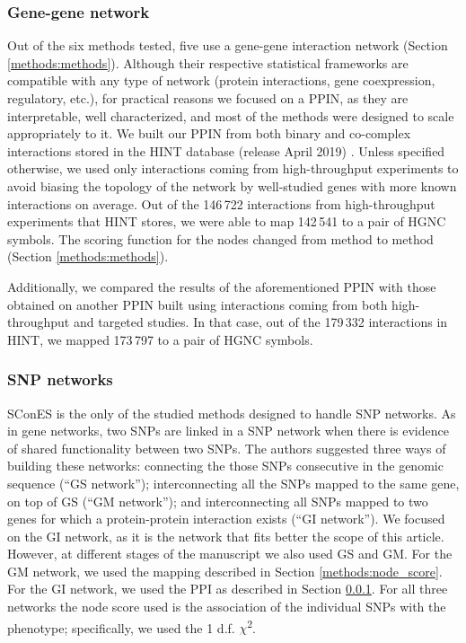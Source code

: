 \documentclass[twocolumn, 10pt]{article}
\begin{document}
\subsubsection{Gene-gene network}
\label{methods:gene_network}
Out of the six methods tested, five use a gene-gene interaction network (Section \ref{methods:methods}). Although their respective statistical frameworks are compatible with any type of network (protein interactions, gene coexpression, regulatory, etc.), for practical reasons we focused on a PPIN, as they are interpretable, well characterized, and most of the methods were designed to scale appropriately to it. We built our PPIN from both binary and co-complex interactions stored in the HINT database (release April 2019) \cite{das_hint:_2012}. Unless specified otherwise, we used only interactions coming from high-throughput experiments to avoid biasing the topology of the network by well-studied genes with more known interactions on average. Out of the 146\,722 interactions from high-throughput experiments that HINT stores, we were able to map 142\,541 to a pair of HGNC symbols. The scoring function for the nodes changed from method to method (Section \ref{methods:methods}).

Additionally, we compared the results of the aforementioned PPIN with those obtained on another PPIN built using interactions coming from both high-throughput and targeted studies. In that case, out of the 179\,332 interactions in HINT, we mapped 173\,797 to a pair of HGNC symbols. 

\subsubsection{SNP networks}
\label{methods:snp_network}
SConES \cite{azencott_efficient_2013} is the only of the studied methods designed to handle SNP networks. As in gene networks, two SNPs are linked in a SNP network when there is evidence of shared functionality between two SNPs. The authors suggested three ways of building these networks: connecting the those SNPs consecutive in the genomic sequence (``GS network''); interconnecting all the SNPs mapped to the same gene, on top of GS (``GM network''); and interconnecting all SNPs mapped to two genes for which a protein-protein interaction exists (``GI network''). We focused on the GI network, as it is the network that fits better the scope of this article. However, at different stages of the manuscript we also used GS and GM. For the GM network, we used the mapping described in Section \ref{methods:node_score}. For the GI network, we used the PPI as described in Section \ref{methods:gene_network}. For all three networks the node score used is the association of the individual SNPs with the phenotype; specifically, we used the 1 d.f. \(\chi\)\textsuperscript{2}.
\end{document}
